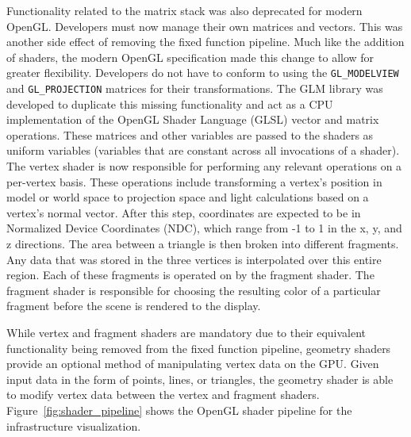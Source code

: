 

Functionality related to the matrix stack was also deprecated for modern OpenGL\@. Developers must now manage their own matrices and vectors. This was another side effect of removing the fixed function pipeline. Much like the addition of shaders, the modern OpenGL specification made this change to allow for greater flexibility. Developers do not have to conform to using the {\tt GL\_MODELVIEW} and {\tt GL\_PROJECTION} matrices for their transformations. The GLM library
\cite{glm_website} was developed to duplicate this missing functionality and act as a CPU implementation of the OpenGL Shader Language (GLSL) vector and matrix operations. These matrices and other variables are passed to the shaders as uniform variables (variables that are constant across all invocations of a shader). The vertex shader is now responsible for performing any relevant operations on a per-vertex basis. These operations include transforming a vertex's position in model or
world space to projection space and light calculations based on a vertex's normal vector. After this step, coordinates are expected to be in Normalized Device Coordinates (NDC), which range from -1 to 1 in the x, y, and z directions. The area between a triangle is then broken into different fragments. Any data that was stored in the three vertices is interpolated over this entire region. Each of these fragments is operated on by the fragment shader. The fragment shader is
responsible for choosing the resulting color of a particular fragment before the scene is rendered to the display.

While vertex and fragment shaders are mandatory due to their equivalent functionality being removed from the fixed function pipeline, geometry shaders provide an optional method of manipulating vertex data on the GPU\@. Given input data in the form of points, lines, or triangles, the geometry shader is able to modify vertex data between the vertex and fragment shaders. Figure~\ref{fig:shader_pipeline} shows the OpenGL shader pipeline for the infrastructure visualization.

